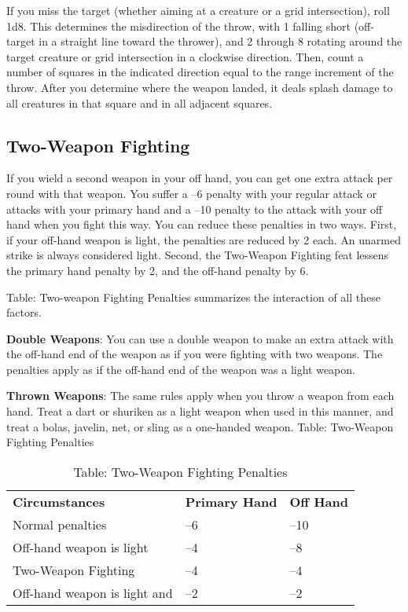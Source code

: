 If you miss the target (whether aiming at a creature or a grid intersection), roll 1d8. This determines the misdirection of the throw, with 1 falling short (off-target in a straight line toward the thrower), and 2 through 8 rotating around the target creature or grid intersection in a clockwise direction. Then, count a number of squares in the indicated direction equal to the range increment of the throw. After you determine where the weapon landed, it deals splash damage to all creatures in that square and in all adjacent squares.
				
\subsection{Two-Weapon Fighting}

				
If you wield a second weapon in your off hand, you can get one extra attack per round with that weapon. You suffer a --6 penalty with your regular attack or attacks with your primary hand and a --10 penalty to the attack with your off hand when you fight this way. You can reduce these penalties in two ways. First, if your off-hand weapon is light, the penalties are reduced by 2 each. An unarmed strike is always considered light. Second, the Two-Weapon Fighting feat lessens the primary hand penalty by 2, and the off-hand penalty by 6.
				
Table: Two-weapon Fighting Penalties summarizes the interaction of all these factors.
				
\textbf{Double Weapons}: You can use a double weapon to make an extra attack with the off-hand end of the weapon as if you were fighting with two weapons. The penalties apply as if the off-hand end of the weapon was a light weapon.
				
\textbf{Thrown Weapons}: The same rules apply when you throw a weapon from each hand. Treat a dart or shuriken as a light weapon when used in this manner, and treat a bolas, javelin, net, or sling as a one-handed weapon.
								Table: Two-Weapon Fighting Penalties
\begin{table}[]
\sffamily
\caption{Table: Two-Weapon Fighting Penalties}
\begin{tabular}{lll}
\textbf{Circumstances} & \textbf{Primary Hand} & \textbf{Off Hand}\\
Normal penalties & –6 & –10\\
Off-hand weapon is light & –4 & –8\\
Two-Weapon Fighting & –4 & –4\\
Off-hand weapon is light and  & –2 & –2\\
\end{tabular}
\end{table}

